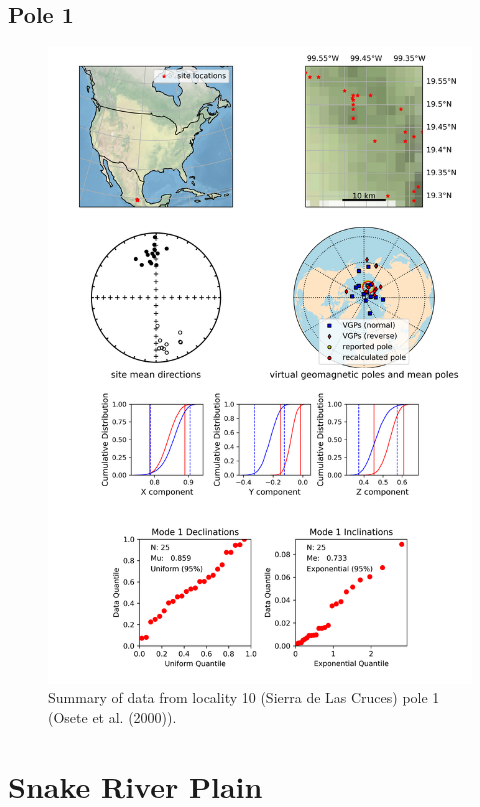 \subsection{Pole 1}


\begin{figure}[H]
\centering
\includegraphics[width=5 in]{./10/1/pole_summary.png}
\caption{Summary of data from locality 10 (Sierra de Las Cruces) pole 1 (Osete et al. (2000)).}
\end{figure}

\section{Snake River Plain}
